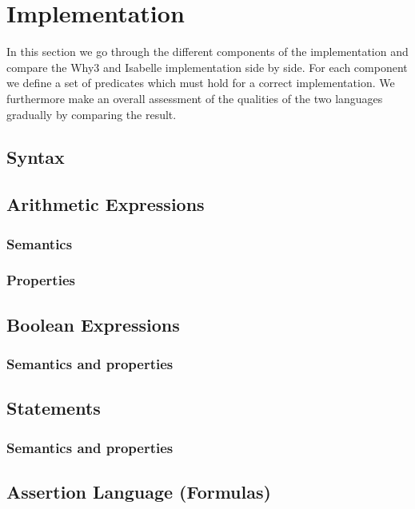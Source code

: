 \section{Implementation}
In this section we go through the different components of the implementation and compare the Why3 and Isabelle
implementation side by side.
For each component we define a set of predicates which must hold for a correct implementation.
We furthermore make an overall assessment of the qualities of the two languages gradually by comparing the result.

\subsection{Syntax}


\subsection{Arithmetic Expressions}

\subsubsection{Semantics}


\subsubsection{Properties}


\subsection{Boolean Expressions}

\subsubsection{Semantics and properties}


\subsection{Statements}
\subsubsection{Semantics and properties}



\subsection{Assertion Language (Formulas)}


